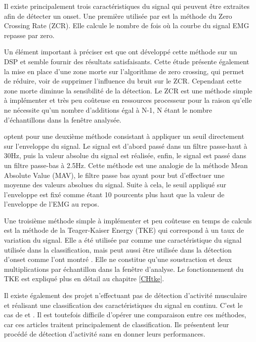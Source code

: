 \documentclass[letterpaper, twoside, 12pt, memoire, creativecommons, hyperref]{thETS}
\begin{document}
Il existe principalement trois caractéristiques du signal qui peuvent être extraites afin de détecter un onset. Une première utilisée par \cite{Chang1996}est la méthode du Zero Crossing Rate (ZCR). Elle calcule le nombre de fois où la courbe du signal EMG repasse par zero. 

Un élément important à préciser est que \cite{Chang1996} ont développé cette méthode sur un DSP et semble fournir des résultats satisfaisants. Cette étude présente également la mise en place d’une zone morte sur l’algorithme de zero crossing, qui permet de réduire, voir de supprimer l’influence du bruit sur le ZCR. Cependant cette zone morte diminue la sensibilité de la détection.
Le ZCR est une méthode simple à implémenter et très peu coûteuse en ressources processeur pour la raison qu’elle ne nécessite qu’un nombre d’additions égal à N-1, N étant le nombre d’échantillons dans la fenêtre analysée. 

\cite{Peleg2002} optent pour une deuxième méthode consistant à appliquer un seuil directement sur l’enveloppe du signal. Le signal est d’abord passé dans un filtre passe-haut à 30Hz, puis la valeur absolue du signal est réalisée, enfin, le signal est passé dans un filtre passe-bas à 2.5Hz. Cette méthode est une analogie de la méthode Mean Absolute Value (MAV), le filtre passe bas ayant pour but d’effectuer une moyenne des valeurs absolues du signal. Suite à cela, le seuil appliqué sur l’enveloppe est fixé comme étant 10 pourcents plus haut que la valeur de l’enveloppe de l’EMG au repos. 

Une troisième méthode simple à implémenter et peu coûteuse en temps de calculs est la méthode de la Teager-Kaiser Energy (TKE) qui correspond à un taux de variation du signal. Elle a été utilisée par \cite{Maheu2011} comme une caractéristique du signal utilisée dans la classification, mais peut aussi être utilisée dans la détection d’onset comme l'ont montré \cite{li2007}. Elle ne constitue qu’une soustraction et deux multiplications par échantillon dans la fenêtre d’analyse. Le fonctionnement du TKE est expliqué plus en détail au chapitre \ref{CHtke}.

Il existe également des projet n'effectuant pas de détection d'activité musculaire et réalisant une classification des caractéristiques du signal en continu. C'est le cas de \cite{Englehart2003} et \cite{Tenore2007}. Il est toutefois difficile d'opérer une comparaison entre ces méthodes, car ces articles traitent principalement de classification. Ils présentent leur procédé de détection d'activité sans en donner leurs performances.
\end{document}
